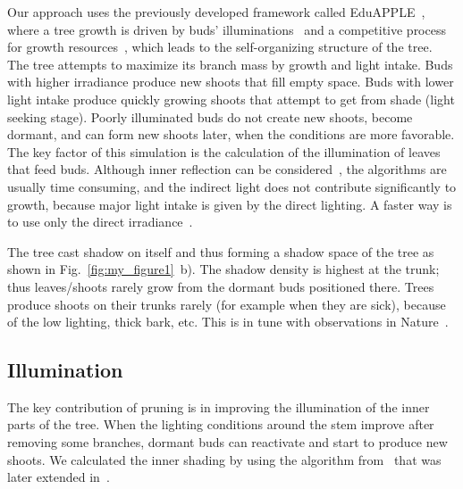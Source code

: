 Our approach uses the previously developed framework called EduAPPLE~\cite{kohek_eduapple:_2015},
where a tree growth is driven by buds' illuminations~\cite{benes_efficient_1996,benes_visual_1997,mech_visual_1996} and a competitive process for growth resources~\cite{alsweis_modeling_2005,arvo_modeling_1988,palubicki_self-organizing_2009,runions_modeling_2007}, which leads to the self-organizing structure of the tree. 
The tree attempts to maximize its branch mass by growth and light intake. Buds with higher irradiance produce new shoots that fill
empty space. Buds with lower light intake produce quickly growing shoots
that attempt to get from shade (light seeking stage). Poorly illuminated buds do not create new shoots, become dormant, and can form new shoots later, when the conditions are more favorable. The key factor of this simulation is the calculation of the illumination of leaves that feed buds. Although inner reflection can be considered~\cite{soler_efficient_2003},
the algorithms are usually time consuming, and the indirect light does
not contribute significantly to growth, because major light intake is
given by the direct lighting. A faster way is to use only the direct
irradiance~\cite{benes_efficient_1996,benes_visual_1997,mech_visual_1996,pirk_plastic_2012}. 

The tree cast shadow on itself and thus
forming a shadow space of the tree as shown in Fig.~\ref{fig:my_figure1}~b). The shadow
density is highest at the trunk; thus leaves/shoots rarely grow from the
dormant buds positioned there. Trees produce shoots on their trunks rarely (for example when they are sick), because of the low lighting, thick bark, etc. This is in tune with observations in Nature~\cite{wohlleben2016hidden}.



\subsection{Illumination}
The key contribution of pruning is in
improving the illumination of the inner parts of the tree. When the
lighting conditions around the stem improve after removing some
branches, dormant buds can reactivate and start to produce new shoots. We calculated the inner shading by using the algorithm from~\cite{palubicki_self-organizing_2009}
that was later extended in~\cite{pirk_plastic_2012,stava_inverse_2014,strnad_novel_2017}. 


